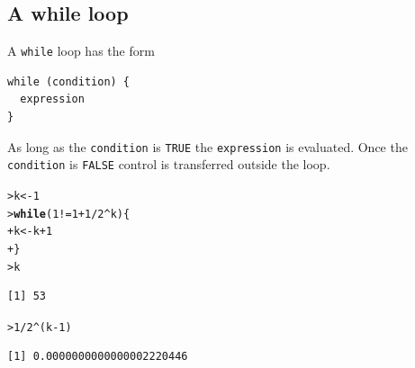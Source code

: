 \documentclass[12pt,oneside]{book}\usepackage[]{graphicx}\usepackage[]{color}
\makeatletter
\newcommand{\hlnum}[1]{\textcolor[rgb]{0.686,0.059,0.569}{#1}}%
\newcommand{\hlopt}[1]{\textcolor[rgb]{0,0,0}{#1}}%
\newcommand{\hlstd}[1]{\textcolor[rgb]{0.345,0.345,0.345}{#1}}%
\newcommand{\hlkwa}[1]{\textcolor[rgb]{0.161,0.373,0.58}{\textbf{#1}}}%
\newcommand{\hlkwb}[1]{\textcolor[rgb]{0.69,0.353,0.396}{#1}}%
\newenvironment{kframe}{%
 \def\at@end@of@kframe{}%
 \ifinner\ifhmode%
  \def\at@end@of@kframe{\end{minipage}}%
  \begin{minipage}{\columnwidth}%
 \fi\fi%
 \def\FrameCommand##1{\hskip\@totalleftmargin \hskip-\fboxsep
 \colorbox{shadecolor}{##1}\hskip-\fboxsep
     \hskip-\linewidth \hskip-\@totalleftmargin \hskip\columnwidth}%
 \MakeFramed {\advance\hsize-\width
   \@totalleftmargin\z@ \linewidth\hsize
   \@setminipage}}%
 {\par\unskip\endMakeFramed%
 \at@end@of@kframe}
\newenvironment{knitrout}{}{} %
\makeatother
\begin{document}
\subsection{A while loop}
A \verb+while+ loop has the form 
\begin{verbatim}
while (condition) {
  expression
}
\end{verbatim}
As long as the \verb+condition+ is \verb+TRUE+ the \verb+expression+ is evaluated. Once the \verb+condition+ is \verb+FALSE+ control is transferred outside the loop.
\begin{knitrout}
\color{fgcolor}\begin{kframe}
\begin{alltt}
\hlstd{> }\hlstd{k} \hlkwb{<-} \hlnum{1}
\hlstd{> }\hlkwa{while} \hlstd{(}\hlnum{1} \hlopt{!=} \hlnum{1} \hlopt{+} \hlnum{1}\hlopt{/}\hlnum{2}\hlopt{^}\hlstd{k) \{}
\hlstd{+ }    \hlstd{k} \hlkwb{<-} \hlstd{k} \hlopt{+} \hlnum{1}
\hlstd{+ }\hlstd{\}}
\hlstd{> }\hlstd{k}
\end{alltt}
\begin{verbatim}
[1] 53
\end{verbatim}
\begin{alltt}
\hlstd{> }\hlnum{1}\hlopt{/}\hlnum{2}\hlopt{^}\hlstd{(k} \hlopt{-} \hlnum{1}\hlstd{)}
\end{alltt}
\begin{verbatim}
[1] 0.0000000000000002220446
\end{verbatim}
\end{kframe}
\end{knitrout}
\end{document}
